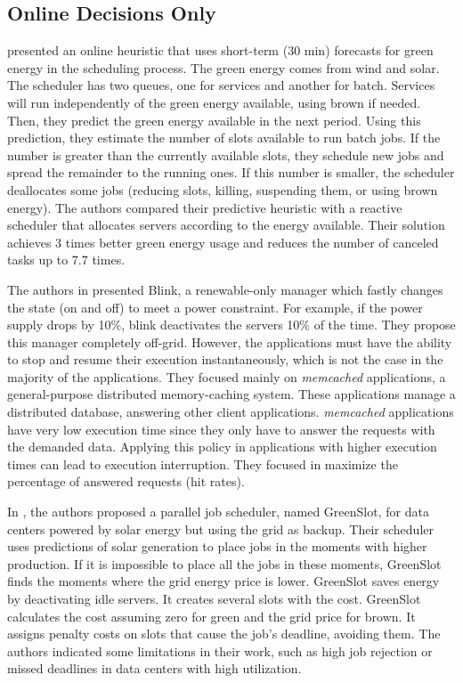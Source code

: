 \subsection{Online Decisions Only}

\citeauthor{aksanli2011utilizing} \cite{aksanli2011utilizing} presented an online heuristic that uses short-term (30 min) forecasts for green energy in the scheduling process. The green energy comes from wind and solar. The scheduler has two queues, one for services and another for batch. Services will run independently of the green energy available, using brown if needed. Then, they predict the green energy available in the next period. Using this prediction, they estimate the number of slots available to run batch jobs. If the number is greater than the currently available slots, they schedule new jobs and spread the remainder to the running ones. If this number is smaller, the scheduler deallocates some jobs (reducing slots, killing, suspending them, or using brown energy). The authors compared their predictive heuristic with a reactive scheduler that allocates servers according to the energy available. Their solution achieves 3 times better green energy usage and reduces the number of canceled tasks up to 7.7 times.

The authors in \cite{sharma2011blink} presented Blink, a renewable-only manager which fastly changes the state (on and off) to meet a power constraint. For example, if the power supply drops by 10\%, blink deactivates the servers 10\% of the time. They propose this manager completely off-grid. However, the applications must have the ability to stop and resume their execution instantaneously, which is not the case in the majority of the applications. They focused mainly on \textit{memcached} applications, a general-purpose distributed memory-caching system. These applications manage a distributed database, answering other client applications. \textit{memcached} applications have very low execution time since they only have to answer the requests with the demanded data. Applying this policy in applications with higher execution times can lead to execution interruption. They focused in maximize the percentage of answered requests (hit rates).

In \cite{goiri2015matching}, the authors proposed a parallel job scheduler, named GreenSlot, for data centers powered by solar energy but using the grid as backup. Their scheduler uses predictions of solar generation to place jobs in the moments with higher production. If it is impossible to place all the jobs in these moments, GreenSlot finds the moments where the grid energy price is lower. GreenSlot saves energy by deactivating idle servers. It creates several slots with the cost. GreenSlot calculates the cost assuming zero for green and the grid price for brown. It assigns penalty costs on slots that cause the job's deadline, avoiding them. The authors indicated some limitations in their work, such as high job rejection or missed deadlines in data centers with high utilization.

